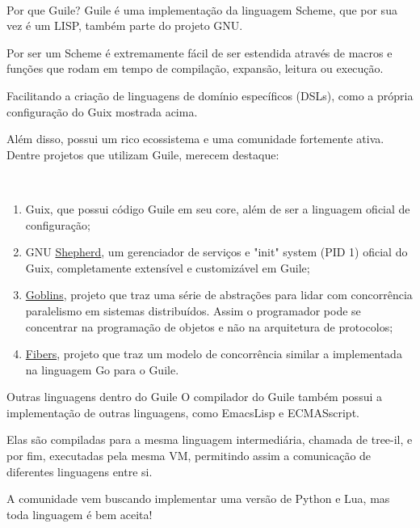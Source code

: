 \documentclass[bigger]{beamer}
\begin{document}
\begin{frame}[label={sec:orgba4d854}]{⁤}
\begin{minipage}[c]{0.5\textwidth}
\end{minipage}
\end{frame}
\begin{frame}[label={sec:org3a90222}]{Por que Guile?}
Guile é uma implementação da linguagem Scheme, que por sua vez é um LISP, também parte do projeto GNU.

Por ser um Scheme é extremamente fácil de ser estendida através de macros e funções que rodam em tempo de
compilação, expansão, leitura ou execução.

Facilitando a criação de linguagens de domínio específicos (DSLs), como a própria configuração do Guix mostrada
acima.

Além disso, possui um rico ecossistema e uma comunidade fortemente ativa. Dentre projetos que utilizam Guile,
merecem destaque:
\end{frame}
\begin{frame}[label={sec:org0acc709}]{⁤}
\begin{enumerate}
\item Guix, que possui código Guile em seu core, além de ser a linguagem oficial de configuração;
\item GNU \href{https://www.gnu.org/software/shepherd/}{Shepherd}, um gerenciador de serviços e "init" system (PID 1) oficial do Guix, completamente extensível
e customizável em Guile;
\item \href{https://spritely.institute/goblins/}{Goblins}, projeto que traz uma série de abstrações para lidar com concorrência paralelismo em sistemas
distribuídos. Assim o programador pode se concentrar na programação de objetos e não na
arquitetura de protocolos;
\item \href{https://github.com/wingo/fibers}{Fibers}, projeto que traz um modelo de concorrência similar a implementada na linguagem Go para o Guile.
\end{enumerate}
\end{frame}
\begin{frame}[label={sec:orgb8b96cc}]{Outras linguagens dentro do Guile}
O compilador do Guile também possui a implementação de outras linguagens, como EmacsLisp e ECMASscript.

Elas são compiladas para a mesma linguagem intermediária, chamada de tree-il, e por fim, executadas pela
mesma VM, permitindo assim a comunicação de diferentes linguagens entre si.

A comunidade vem buscando implementar uma versão de Python e Lua, mas toda linguagem é bem aceita!
\end{frame}
\end{document}
